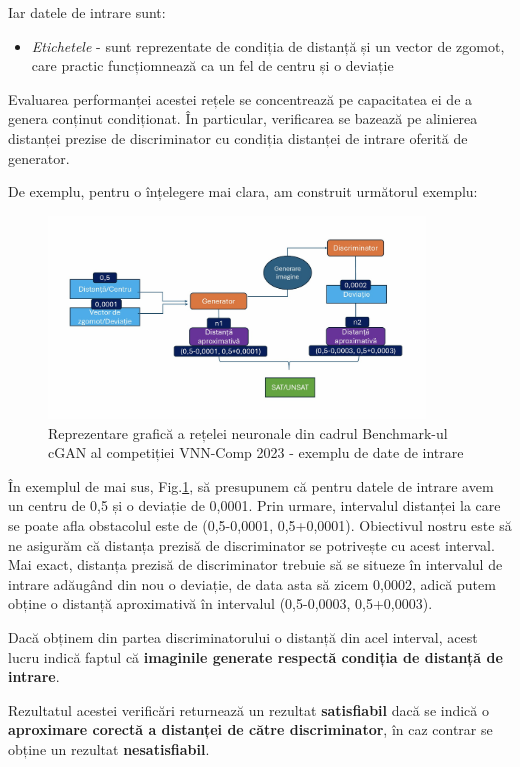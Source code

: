 Iar datele de intrare sunt:

\begin{itemize}
  \item \textit{Etichetele} -  sunt reprezentate de condiția de distanță și un vector de zgomot, care practic funcțiomnează ca un fel de centru și o deviație
\end{itemize}

Evaluarea performanței acestei rețele se concentrează pe capacitatea ei de a genera conținut condiționat. În particular, verificarea se bazează pe  alinierea distanței prezise de discriminator cu condiția distanței de intrare oferită de generator.

De exemplu, pentru o înțelegere mai clara, am construit următorul exemplu:

\begin{figure}[ht]
\centering
\includegraphics[width=10cm]{imagini/introducere/slide2Ale.jpeg}
\caption{Reprezentare grafică a rețelei neuronale din cadrul Benchmark-ul cGAN al competiției VNN-Comp 2023 - exemplu de date de intrare}
\label{reprezentare_grafica_cGAN_exemplu}
\end{figure}

În exemplul de mai sus, Fig.\ref{reprezentare_grafica_cGAN_exemplu}, să presupunem că pentru datele de intrare avem un centru de 0,5 și o deviație de 0,0001. Prin urmare, intervalul distanței la care se poate afla obstacolul este de (0,5-0,0001, 0,5+0,0001). Obiectivul nostru este să ne asigurăm că distanța prezisă de discriminator se potrivește cu acest interval. Mai exact, distanța prezisă de discriminator trebuie să se situeze în intervalul de intrare adăugând din nou o deviație, de data asta să zicem 0,0002, adică putem obține o distanță aproximativă în intervalul (0,5-0,0003, 0,5+0,0003).
\newline

Dacă obținem din partea discriminatorului o distanță din acel interval, acest lucru indică faptul că \textbf{imaginile generate respectă condiția de distanță de intrare}.

Rezultatul acestei verificări returnează un rezultat \textbf{satisfiabil} dacă se indică o \textbf{aproximare corectă a distanței de către discriminator}, în caz contrar se obține un rezultat \textbf{nesatisfiabil}.